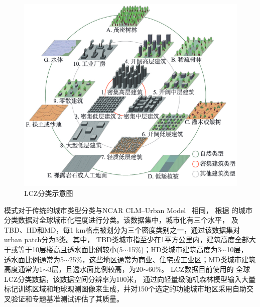 {
\begin{figure}[htbp]
\centering
\includegraphics{Figures/基础数据/LCZ分类图示.png}
\caption{LCZ分类示意图}
\label{fig:LCZ分类图示}
\end{figure}
}


模式对于传统的城市类型分类与NCAR CLM--Urban Model~\citep{oleson2020parameterization} 相同，
根据 \citet{jackson2013parameterization} 的城市分类数据对全球城市化程度进行分类。该数据集中，城市化有三个水平，
及TBD、HD和MD，每1 km格点被划分为三个密度类别之一，通过该数据集对urban patch分为3类。其中，
TBD类城市指至少在1平方公里内，建筑高度全部大于或等于10层楼高且透水面比例较小(5$\sim$15\%)；HD类城市建筑高度为3$\sim$10层，
透水面比例通常为5$\sim$25\%，这些地区通常为商业、住宅或工业区；MD类城市建筑高度通常为1$\sim$3层，且透水面比例较高，为20$\sim$60\%。
LCZ数据目前使用的 \citet{demuzere2022global} 全球LCZ分类数据，该数据空间分辨率为100米，
通过向轻量级随机森林模型输入大量标记训练区域和地球观测图像来生成，并对150个选定的功能城市地区采用自助交叉验证和专题基准测试评估了其质量。


